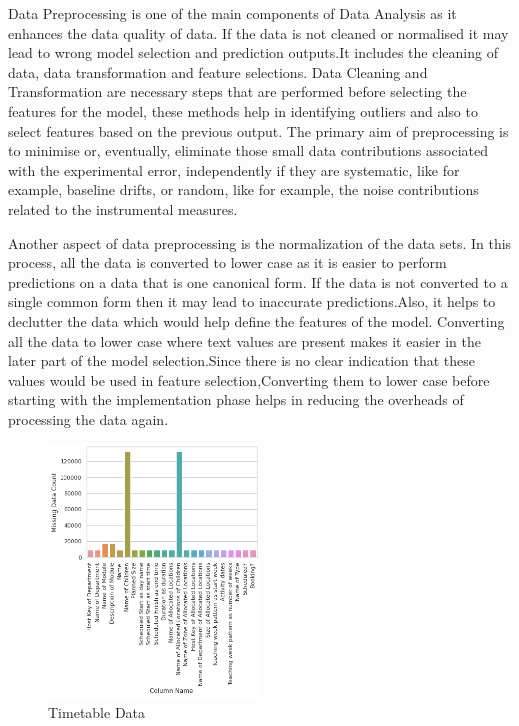 \thispagestyle{empty}
\par Data Preprocessing is one of the main components of Data Analysis as it enhances the data quality of data. If the data is not cleaned or normalised it may lead to wrong model selection and prediction outputs.It includes the cleaning of data, data transformation and feature selections. Data Cleaning and Transformation are necessary steps that are performed before selecting the features for the model, these methods help in identifying outliers and also to select features based on the previous output.
The primary aim of preprocessing is to minimise or, eventually, eliminate those small data contributions associated with the experimental error, independently if they are systematic, like for example, baseline drifts, or random, like for example, the noise contributions related to the instrumental measures\cite{pre_processing}.

Another aspect of data preprocessing is the normalization of the data sets. In this process, all the data is converted to lower case as it is easier to perform predictions on a  data that is one canonical form.
If the data is not converted to a single common form then it may lead to inaccurate predictions.Also, it helps to declutter the data which would help define the features of the model. Converting all the data to lower case where text values are present makes it easier in the later part of the model selection.Since there is no clear indication that these values would be used in feature selection,Converting them to lower case before starting with the implementation phase helps in reducing the overheads of processing the data again.
\begin{figure}[H]
    \centering
    \includegraphics[width=0.5\textwidth]{resources/images/timetable data.png}
    \caption{Timetable Data}
    \label{timetable_data}
\end{figure}

